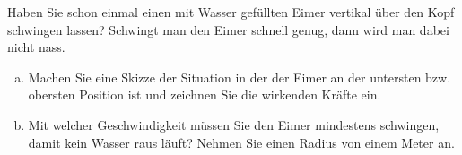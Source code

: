 
\begin{aufgabe}
	
Haben Sie schon einmal einen mit Wasser gefüllten Eimer vertikal über den Kopf schwingen lassen?
Schwingt man den Eimer schnell genug, dann wird man dabei nicht nass.
\begin{enumerate} [a)]
	\item Machen Sie eine Skizze der Situation in der der Eimer an der untersten bzw.~ obersten Position ist
und zeichnen Sie die wirkenden Kräfte ein.
\item Mit welcher Geschwindigkeit müssen Sie den Eimer mindestens schwingen, damit kein Wasser raus läuft? 
	Nehmen Sie einen Radius von einem Meter an.
\end{enumerate}
\end{aufgabe}
\begin{loesung}

\end{loesung}
